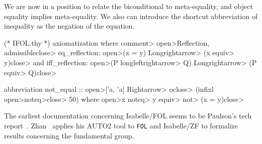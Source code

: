 \begin{node}[Formulas]
\begin{node}\label{isabelle:fol-0005}%
We are now in a position to relate the biconditional to meta-equality,
and object equality implies meta-equality. We also can introduce the
shortcut abbreviation of inequality as the negation of the equation.
\begin{Isabelle}
(* IFOL.thy *)
axiomatization where  \<comment> \<open>Reflection, admissible\<close>
  eq_reflection: \<open>(x = y) \<Longrightarrow> (x \<equiv> y)\<close> and
  iff_reflection: \<open>(P \<longleftrightarrow> Q) \<Longrightarrow> (P \<equiv> Q)\<close>

abbreviation not_equal :: \<open>['a, 'a] \<Rightarrow> o\<close>  (infixl \<open>\<noteq>\<close> 50)
  where \<open>x \<noteq> y \<equiv> \<not> (x = y)\<close>
\end{Isabelle}
\end{node}
\end{node}

\begin{node}[References]\label{isabelle:fol-0002}%
The earliest documentation concerning Isabelle/FOL seems to be Paulson's
tech report~\cite{paulson1993object}. Zhan~\cite{Zhan2017formalization}
applies his AUTO2 tool to \texttt{FOL} and Isabelle/ZF to formalize
results concerning the fundamental group.
\end{node}